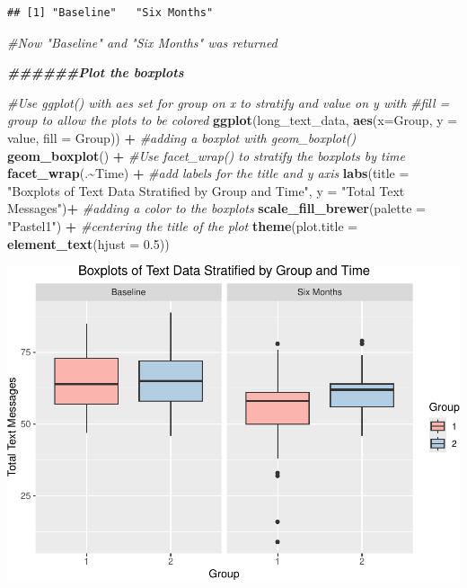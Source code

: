 \documentclass[
]{article}
\newenvironment{Shaded}{\begin{snugshade}}{\end{snugshade}}
\newcommand{\AttributeTok}[1]{\textcolor[rgb]{0.13,0.29,0.53}{#1}}
\newcommand{\CommentTok}[1]{\textcolor[rgb]{0.56,0.35,0.01}{\textit{#1}}}
\newcommand{\DocumentationTok}[1]{\textcolor[rgb]{0.56,0.35,0.01}{\textbf{\textit{#1}}}}
\newcommand{\FloatTok}[1]{\textcolor[rgb]{0.00,0.00,0.81}{#1}}
\newcommand{\FunctionTok}[1]{\textcolor[rgb]{0.13,0.29,0.53}{\textbf{#1}}}
\newcommand{\NormalTok}[1]{#1}
\newcommand{\SpecialCharTok}[1]{\textcolor[rgb]{0.81,0.36,0.00}{\textbf{#1}}}
\newcommand{\StringTok}[1]{\textcolor[rgb]{0.31,0.60,0.02}{#1}}
\begin{document}
\begin{verbatim}
## [1] "Baseline"   "Six Months"
\end{verbatim}

\begin{Shaded}
\begin{Highlighting}[]
\CommentTok{\#Now "Baseline" and "Six Months" was returned}


\DocumentationTok{\#\#\#\#\#\#Plot the boxplots}

\CommentTok{\#Use ggplot() with aes set for group on x to stratify and value on y with}
\CommentTok{\#fill = group to allow the plots to be colored}
\FunctionTok{ggplot}\NormalTok{(long\_text\_data, }\FunctionTok{aes}\NormalTok{(}\AttributeTok{x=}\NormalTok{Group, }\AttributeTok{y =}\NormalTok{ value, }\AttributeTok{fill =}\NormalTok{ Group)) }\SpecialCharTok{+} 
  \CommentTok{\#adding a boxplot with geom\_boxplot()}
  \FunctionTok{geom\_boxplot}\NormalTok{() }\SpecialCharTok{+}
  \CommentTok{\#Use facet\_wrap() to stratify the boxplots by time}
  \FunctionTok{facet\_wrap}\NormalTok{(.}\SpecialCharTok{\textasciitilde{}}\NormalTok{Time) }\SpecialCharTok{+}
  \CommentTok{\#add labels for the title and y axis}
  \FunctionTok{labs}\NormalTok{(}\AttributeTok{title =} \StringTok{"Boxplots of Text Data Stratified by Group and Time"}\NormalTok{,}
       \AttributeTok{y =} \StringTok{"Total Text Messages"}\NormalTok{)}\SpecialCharTok{+} 
  \CommentTok{\#adding a color to the boxplots}
  \FunctionTok{scale\_fill\_brewer}\NormalTok{(}\AttributeTok{palette =} \StringTok{"Pastel1"}\NormalTok{) }\SpecialCharTok{+} 
  \CommentTok{\#centering the title of the plot}
  \FunctionTok{theme}\NormalTok{(}\AttributeTok{plot.title =} \FunctionTok{element\_text}\NormalTok{(}\AttributeTok{hjust =} \FloatTok{0.5}\NormalTok{))}
\end{Highlighting}
\end{Shaded}

\includegraphics{Assignment_3_Collaborating_in_Github_files/figure-latex/Visual 1 Stratified Boxplot-1.pdf}
\end{document}
